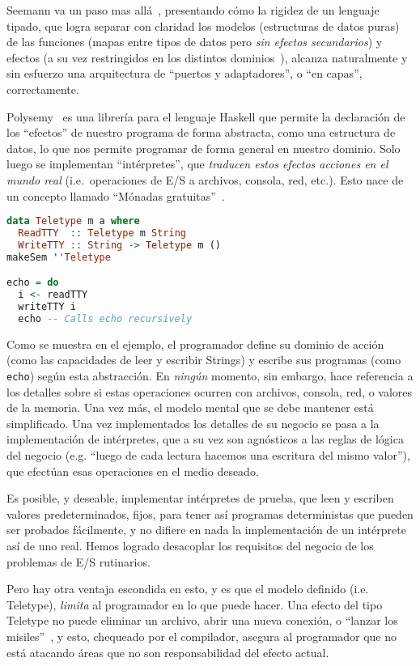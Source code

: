 \documentclass[12pt]{article}
\begin{document}
Seemann va un paso mas allá~\autocite{pitofsuccess}, presentando cómo la rigidez
de un lenguaje tipado, que logra separar con claridad los modelos (estructuras
de datos puras) de las funciones (mapas entre tipos de datos pero \emph{sin
efectos secundarios}) y efectos (a su vez restringidos en los distintos
dominios~\autocite{modernfp}), alcanza naturalmente y sin esfuerzo una
arquitectura de ``puertos y adaptadores'', o ``en capas'', correctamente.

Polysemy~\autocite{polysemy} es una librería para el lenguaje Haskell que permite
la declaración de los ``efectos'' de nuestro programa de forma abstracta,
como una estructura de datos, lo que nos permite programar de forma
general en nuestro dominio.
Solo luego se implementan ``intérpretes'', que \emph{traducen estos efectos
acciones en el mundo real} (i.e.\ operaciones de E/S a archivos, consola, red,
etc.).
Esto nace de un concepto llamado ``Mónadas gratuitas''~\autocite{freermonads}.

\begin{lstlisting}[language=Haskell]
data Teletype m a where
  ReadTTY  :: Teletype m String
  WriteTTY :: String -> Teletype m ()
makeSem ''Teletype

echo = do
  i <- readTTY
  writeTTY i
  echo -- Calls echo recursively
\end{lstlisting}

Como se muestra en el ejemplo, el programador define su dominio de acción (como
las capacidades de leer y escribir Strings) y escribe sus programas (como
\texttt{echo}) según esta abstracción.
En \emph{ningún} momento, sin embargo, hace referencia a los detalles sobre si
estas operaciones ocurren con archivos, consola, red, o valores de la memoria.
Una vez más, el modelo mental que se debe mantener está simplificado.
Una vez implementados los detalles de su negocio se pasa a la implementación de
intérpretes, que a su vez son agnósticos a las reglas de lógica del negocio
(e.g. ``luego de cada lectura hacemos una escritura del mismo valor''), que
efectúan esas operaciones en el medio deseado.

Es posible, y deseable, implementar intérpretes de prueba, que leen y escriben
valores predeterminados, fijos, para tener así programas deterministas que pueden
ser probados fácilmente, y no difiere en nada la implementación de un intérprete
así de uno real.
Hemos logrado desacoplar los requisitos del negocio de los problemas de E/S
rutinarios.

Pero hay otra ventaja escondida en esto, y es que el modelo definido (i.e.
Teletype), \emph{limita} al programador en lo que puede hacer.
Una efecto del tipo Teletype no puede eliminar un archivo, abrir una nueva
conexión, o ``lanzar los misiles''~\autocite{missiles}, y esto, chequeado por
el compilador, asegura al programador que no está atacando áreas que no son
responsabilidad del efecto actual.
\end{document}
